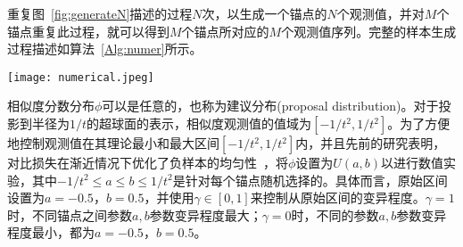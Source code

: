 重复图~\ref{fig:generateN}描述的过程$N$次，以生成一个锚点的$N$个观测值，并对$M$个锚点重复此过程，就可以得到$M$个锚点所对应的$M$个观测值序列。完整的样本生成过程描述如算法~\ref{Alg:numer}所示。
\begin{figure*}[!]
	\centering
	\texttt{[image: numerical.jpeg]}
	\caption{未标注样本相似度分数生成过程示意图}
	\label{fig:generateN}
\end{figure*}
\begin{algorithm}[!]
	\caption{未标注样本相似度分数观测值生成过程}\label{Alg:numer}
	\BlankLine
\end{algorithm}

相似度分数分布$\phi$可以是任意的，也称为建议分布(proposal distribution)。对于投影到半径为$1/t$的超球面的表示，相似度观测值的值域为$[-1/t^2, 1/t^2]$。为了方便地控制观测值在其理论最小和最大区间$[-1/t^2,1/t^2]$内，并且先前的研究表明，对比损失在渐近情况下优化了负样本的均匀性~\cite{Wang:2020:ICML}，将$\phi$设置为$U(a,b)$以进行数值实验，其中$-1/t^2\leq a \leq b \leq 1/t^2$是针对每个锚点随机选择的。具体而言，原始区间设置为$a=-0.5$，$b=0.5$，并使用$\gamma \in [0,1]$来控制从原始区间的变异程度。$\gamma=1$时，不同锚点之间参数$a,b$参数变异程度最大；$\gamma=0$时，不同的参数$a,b$参数变异程度最小，都为$a=-0.5$，$b=0.5$。

